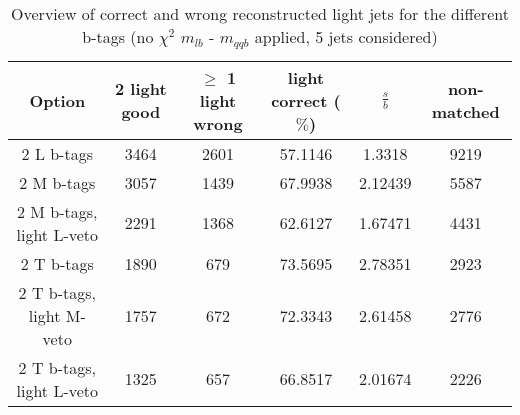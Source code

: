 \begin{table}[!h] 
 \begin{tabular}{c|c|c|c|c|c} 
  \textbf{Option} & 2 light good  & $\geq$ 1 light wrong & light correct ($\%$) & $\frac{s}{b}$ & non-matched \\ \hline 
  2 L b-tags              & 3464 & 2601 & 57.1146 & 1.3318 & 9219\\ 
  2 M b-tags              & 3057 & 1439 & 67.9938 & 2.12439 & 5587\\ 
  2 M b-tags, light L-veto & 2291 & 1368 & 62.6127 & 1.67471 & 4431\\ 
  2 T b-tags              & 1890 & 679 & 73.5695 & 2.78351 & 2923\\ 
  2 T b-tags, light M-veto & 1757 & 672 & 72.3343 & 2.61458 & 2776\\ 
  2 T b-tags, light L-veto & 1325 & 657 & 66.8517 & 2.01674 & 2226\\ 
 \end{tabular} 
 \caption{Overview of correct and wrong reconstructed light jets for the different b-tags (no $\chi^{2}$ $m_{lb}$ - $m_{qqb}$ applied, 5 jets considered)}
\end{table} 
 
